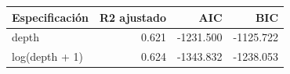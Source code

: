 \begin{tabular}{lrrr}
\toprule
Especificación & R2 ajustado & AIC & BIC \\
\midrule
depth & 0.621 & -1231.500 & -1125.722 \\
log(depth + 1) & 0.624 & -1343.832 & -1238.053 \\
\bottomrule
\end{tabular}
